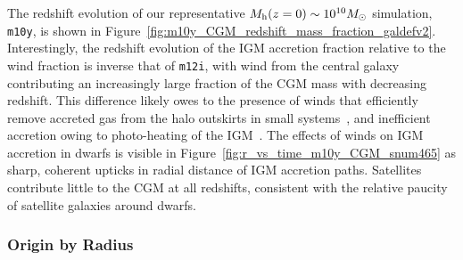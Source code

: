 \documentclass[fleqn,usenatbib]{mnras}
\begin{document}
The redshift evolution of our representative $M_{\rm h}(z=0) \sim 10^{10} M_\odot$ simulation, \texttt{m10y}, is shown in Figure~\ref{fig:m10y_CGM_redshift_mass_fraction_galdefv2}.
Interestingly, the redshift evolution of the IGM accretion fraction relative to the wind fraction is inverse that of \texttt{m12i}, with wind from the central galaxy contributing an increasingly large fraction of the CGM mass with decreasing redshift. 
This difference likely owes to the presence of winds that efficiently remove accreted gas from the halo outskirts in small systems~\citep[e.g.][]{Muratov2015}, and inefficient accretion owing to photo-heating of the IGM~\citep[the maximum halo mass affected by the UV background increases with deacreasing redshift, e.g.][]{Faucher-Giguere2011,El-Badry2017}.
The effects of winds on IGM accretion in dwarfs is visible in Figure~\ref{fig:r_vs_time_m10y_CGM_snum465} as sharp, coherent upticks in radial distance of IGM accretion paths. 
Satellites contribute little to the CGM at all redshifts, consistent with the relative paucity of satellite galaxies around dwarfs.

\subsubsection{Origin by Radius}
\label{sec:origin_by_radius}
\end{document}
